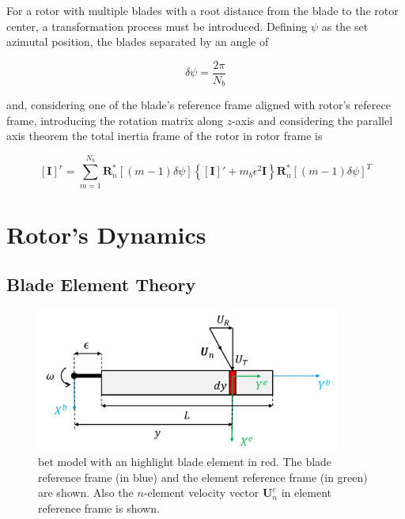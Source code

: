 For a rotor with multiple blades with a root distance from the blade to the rotor center, a transformation process must be introduced. Defining $\psi$ as the set azimutal position, the blades separated by an angle of

\begin{equation}
    \delta\psi = \frac{2\pi}{N_b}
\end{equation}

and, considering one of the blade's reference frame aligned with rotor's referece frame, introducing the rotation matrix along $z$-axis and considering the parallel axis theorem the total inertia frame of the rotor in rotor frame is

\begin{equation}
    \left[\mathbf{I}\right]^r = \sum_{m=1}^{N_b} \boldsymbol{R}_n^*\left[(m-1)\delta\psi\right] \left\{ \left[\mathbf{I}\right]' + m_b \epsilon^2 \boldsymbol{I} \right\} \boldsymbol{R}_n^*\left[(m-1)\delta\psi\right]^T
\end{equation}





\section{Rotor's Dynamics}
\label{section:rotor_dynamics}

\subsection{Blade Element Theory}
\label{section:bet}


\begin{figure}[!htb]
    \centering
    \includegraphics[width=10cm]{Figures/background/bet/blade.png}
    \caption{\gls{bet} model with an highlight blade element in red. The blade reference frame (in blue) and the element reference frame (in green) are shown. Also the $n$-element velocity vector $\mathbf{U}^e_n$ in element reference frame is shown.}
    \label{fig:blade_bet}
\end{figure}

